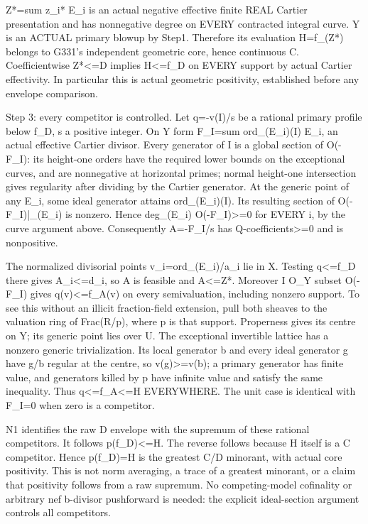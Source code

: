 \documentclass[11pt]{article}
\begin{document}
Z*=sum z\_i* E\_i is an actual negative effective finite REAL Cartier presentation and has nonnegative degree on EVERY contracted integral curve. Y is an ACTUAL primary blowup by Step1. Therefore its evaluation H=f\_(Z*) belongs to G331's independent geometric core, hence continuous C. Coefficientwise Z*<=D implies H<=f\_D on EVERY support by actual Cartier effectivity. In particular this is actual geometric positivity, established before any envelope comparison.

Step 3: every competitor is controlled. Let q=-v(I)/s be a rational primary profile below f\_D, s a positive integer. On Y form F\_I=sum ord\_(E\_i)(I) E\_i, an actual effective Cartier divisor. Every generator of I is a global section of O(-F\_I): its height-one orders have the required lower bounds on the exceptional curves, and are nonnegative at horizontal primes; normal height-one intersection gives regularity after dividing by the Cartier generator. At the generic point of any E\_i, some ideal generator attains ord\_(E\_i)(I). Its resulting section of O(-F\_I)|\_(E\_i) is nonzero. Hence deg\_(E\_i) O(-F\_I)>=0 for EVERY i, by the curve argument above. Consequently A=-F\_I/s has Q-coefficients>=0 and is nonpositive.

The normalized divisorial points v\_i=ord\_(E\_i)/a\_i lie in X. Testing q<=f\_D there gives A\_i<=d\_i, so A is feasible and A<=Z*. Moreover I O\_Y subset O(-F\_I) gives q(v)<=f\_A(v) on every semivaluation, including nonzero support. To see this without an illicit fraction-field extension, pull both sheaves to the valuation ring of Frac(R/p), where p is that support. Properness gives its centre on Y; its generic point lies over U. The exceptional invertible lattice has a nonzero generic trivialization. Its local generator b and every ideal generator g have g/b regular at the centre, so v(g)>=v(b); a primary generator has finite value, and generators killed by p have infinite value and satisfy the same inequality. Thus q<=f\_A<=H EVERYWHERE. The unit case is identical with F\_I=0 when zero is a competitor.

N1 identifies the raw D envelope with the supremum of these rational competitors. It follows p(f\_D)<=H. The reverse follows because H itself is a C competitor. Hence p(f\_D)=H is the greatest C/D minorant, with actual core positivity. This is not norm averaging, a trace of a greatest minorant, or a claim that positivity follows from a raw supremum. No competing-model cofinality or arbitrary nef b-divisor pushforward is needed: the explicit ideal-section argument controls all competitors.
\end{document}
